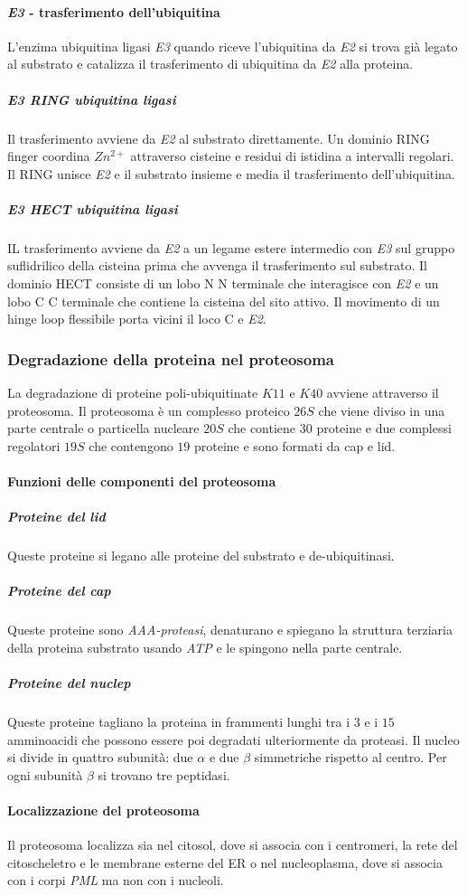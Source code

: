 \paragraph{\emph{E3} - trasferimento dell'ubiquitina}
L'enzima ubiquitina ligasi \emph{E3} quando riceve l'ubiquitina da \emph{E2} si trova gi\`a legato al substrato e catalizza il trasferimento di ubiquitina da \emph{E2} alla proteina. 
\subparagraph{\emph{E3 RING} ubiquitina ligasi}
Il trasferimento avviene da \emph{E2} al substrato direttamente. Un dominio RING finger coordina \emph{$Zn^{2+}$} attraverso cisteine e residui di istidina a intervalli regolari. Il RING unisce 
\emph{E2} e il substrato insieme e media il trasferimento dell'ubiquitina. 
\subparagraph{\emph{E3 HECT} ubiquitina ligasi}
IL trasferimento avviene da \emph{E2} a un legame estere intermedio con \emph{E3} sul gruppo suflidrilico della cisteina prima che avvenga il trasferimento sul substrato. Il dominio HECT consiste di un
lobo N N terminale che interagisce con \emph{E2} e un lobo C C terminale che contiene la cisteina del sito attivo. Il movimento di un hinge loop flessibile porta vicini il loco C e \emph{E2}. 
\subsubsection{Degradazione della proteina nel proteosoma}
La degradazione di proteine poli-ubiquitinate $K11$ e $K40$ avviene attraverso il proteosoma. Il proteosoma \`e un complesso proteico $26S$ che viene diviso in una parte centrale o particella nucleare
$20S$ che contiene $30$ proteine e due complessi regolatori $19S$ che contengono $19$ proteine e sono formati da cap e lid. 
\paragraph{Funzioni delle componenti del proteosoma}
\subparagraph{Proteine del lid}
Queste proteine si legano alle proteine del substrato e de-ubiquitinasi.
\subparagraph{Proteine del cap}
Queste proteine sono \emph{AAA-proteasi}, denaturano e spiegano la struttura terziaria della proteina substrato usando \emph{ATP} e le spingono nella parte centrale.
\subparagraph{Proteine del nuclep}
Queste proteine tagliano la proteina in frammenti lunghi tra i $3$ e i $15$ amminoacidi che possono essere poi degradati ulteriormente da proteasi. Il nucleo si divide in quattro subunit\`a: 
due $\alpha$ e due $\beta$ simmetriche rispetto al centro. Per ogni subunit\`a $\beta$ si trovano tre peptidasi. 
\paragraph{Localizzazione del proteosoma}
Il proteosoma localizza sia nel citosol, dove si associa con i centromeri, la rete del citoscheletro e le membrane esterne del ER o nel nucleoplasma, dove si associa con i corpi \emph{PML} ma non con i nucleoli.
